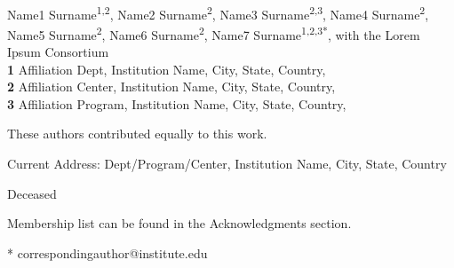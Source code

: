 \documentclass[
  10pt,
  letterpaper,
]{article}
\begin{document}
\vspace*{0.2in}

\begin{flushleft}
{\Large
\textbf{} %
}
\newline
\\
Name1 Surname\textsuperscript{1,2\Yinyang}, Name2
Surname\textsuperscript{2\Yinyang}, Name3
Surname\textsuperscript{2,3}, Name4 Surname\textsuperscript{2}, Name5
Surname\textsuperscript{2}, Name6 Surname\textsuperscript{2}, Name7
Surname\textsuperscript{1,2,3*}, with the Lorem Ipsum
Consortium\textsuperscript{\textpilcrow}
\\
\bigskip
\textbf{1} Affiliation Dept, Institution
Name, City, State, Country, \\ \textbf{2} Affiliation Center,
Institution Name, City, State, Country, \\ \textbf{3} Affiliation
Program, Institution Name, City, State, Country, 
\bigskip

% 
%
\Yinyang These authors contributed equally to this work.


\textcurrency Current Address: Dept/Program/Center, Institution Name, City, State, Country %

\dag Deceased

\textpilcrow Membership list can be found in the Acknowledgments section.

* correspondingauthor@institute.edu

\end{flushleft}
\end{document}
